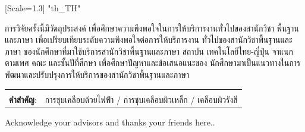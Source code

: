 \documentclass[12pt,oneside,openright,a4paper]{cpe-english-project}
\begin{document}
{\newfontfamily{}[Scale=1.3]
\XeTeXlinebreaklocale "th_TH"	
\thaifont
\thaiabstract

การวิจัยครั้งนี้มีวัตถุประสงค์  เพื่อศึกษาความพึงพอใจในการให้บริการงานทั่วไปของสานักวิชา พื้นฐานและภาษา เพื่อเปรียบเทียบระดับความพึงพอใจต่อการให้บริการงาน ทั่วไปของสานักวิชาพื้นฐานและภาษา ของนักศึกษาที่มาใช้บริการสานักวิชาพื้นฐานและภาษา สถาบัน เทคโนโลยีไทย-ญี่ปุ่น จาแนกตามเพศ คณะ และชั้นปีที่ศึกษา เพื่อศึกษาปัญหาและข้อเสนอแนะของ นักศึกษามาเป็นแนวทางในการพัฒนาและปรับปรุงการให้บริการของสานักวิชาพื้นฐานและภาษา

\begin{flushleft}
\begin{tabular*}{\textwidth}{@{}lp{}}
 & \\

\textbf{คำสำคัญ}: & การชุบเคลือบด้วยไฟฟ้า / การชุบเคลือบผิวเหล็ก /  เคลือบผิวรังสี
\end{tabular*}
\end{flushleft}
\endabstract
}

\preface
Acknowledge your advisors and thanks your friends here..

\tableofcontents                    
\listoftables
\listoffigures                      
\end{document}
